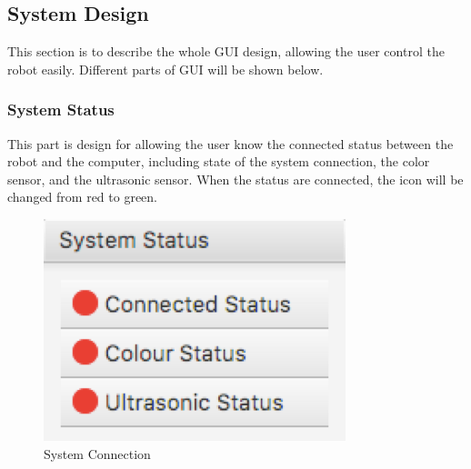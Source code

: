 \documentclass[10pt,a4paper,titlepage]{article}
\begin{document}
   
  \subsection{System Design} 
  This section is to describe the whole GUI design, allowing the user control the robot easily. Different parts of GUI will be shown below.
 
  \subsubsection{System Status} 
  This part is design for allowing the user know the connected status between the robot and the computer, including state of the system connection, the color sensor, and the ultrasonic sensor. When the status are connected, the icon will be changed from red to green.
   
  \begin{figure}[H] 
  \includegraphics[width=\linewidth]{systemconnect.png}  %
  \caption{System Connection} 
  \label{fig:System Connection}               
  \end{figure} 
   
\end{document}

